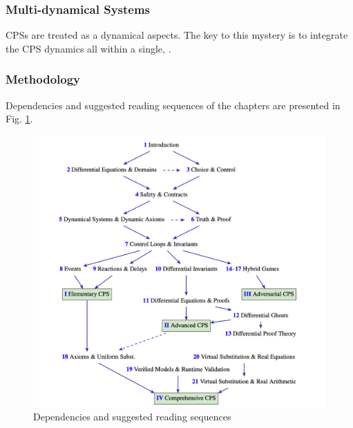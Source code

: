 \subsubsection{Multi-dynamical Systems}

CPSs are treated as a  
dynamical aspects.
The key to this mystery is to integrate the CPS dynamics all within a single,
.


\subsubsection{Methodology}

Dependencies and suggested reading sequences of the chapters are presented in 
Fig. \ref{fig:socps}.

\begin{figure}[H]
  \centering
  \includegraphics[width=.85\linewidth]
    {notes/hybrid-dynamical-system/logical-foundations-of-CPS/img/structure-of-cps.png}
  \caption{Dependencies and suggested reading sequences}
  \label{fig:socps}
\end{figure}

\crule